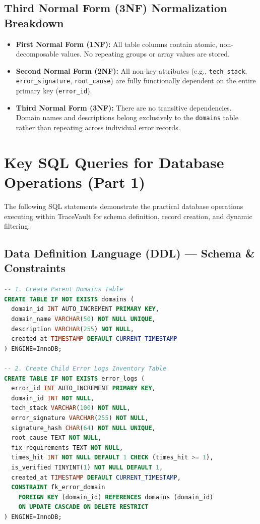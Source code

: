 \documentclass[10pt,a4paper]{article}
\begin{document}
\subsection{Third Normal Form (3NF) Normalization Breakdown}
\begin{itemize}
  \item \textbf{First Normal Form (1NF):} All table columns contain atomic, non-decomposable values. No repeating groups or array values are stored.
  \item \textbf{Second Normal Form (2NF):} All non-key attributes (e.g., \texttt{tech\_stack}, \texttt{error\_signature}, \texttt{root\_cause}) are fully functionally dependent on the entire primary key (\texttt{error\_id}).
  \item \textbf{Third Normal Form (3NF):} There are no transitive dependencies. Domain names and descriptions belong exclusively to the \texttt{domains} table rather than repeating across individual error records.
\end{itemize}

\newpage

\section{Key SQL Queries for Database Operations (Part 1)}
The following SQL statements demonstrate the practical database operations executing within TraceVault for schema definition, record creation, and dynamic filtering:

\subsection{Data Definition Language (DDL) --- Schema \& Constraints}
\begin{lstlisting}[language=SQL, caption={DDL Table Creation with Referential Integrity and Check Constraints}]
-- 1. Create Parent Domains Table
CREATE TABLE IF NOT EXISTS domains (
  domain_id INT AUTO_INCREMENT PRIMARY KEY,
  domain_name VARCHAR(50) NOT NULL UNIQUE,
  description VARCHAR(255) NOT NULL,
  created_at TIMESTAMP DEFAULT CURRENT_TIMESTAMP
) ENGINE=InnoDB;

-- 2. Create Child Error Logs Inventory Table
CREATE TABLE IF NOT EXISTS error_logs (
  error_id INT AUTO_INCREMENT PRIMARY KEY,
  domain_id INT NOT NULL,
  tech_stack VARCHAR(100) NOT NULL,
  error_signature VARCHAR(255) NOT NULL,
  signature_hash CHAR(64) NOT NULL UNIQUE,
  root_cause TEXT NOT NULL,
  fix_requirements TEXT NOT NULL,
  times_hit INT NOT NULL DEFAULT 1 CHECK (times_hit >= 1),
  is_verified TINYINT(1) NOT NULL DEFAULT 1,
  created_at TIMESTAMP DEFAULT CURRENT_TIMESTAMP,
  CONSTRAINT fk_error_domain
    FOREIGN KEY (domain_id) REFERENCES domains (domain_id)
    ON UPDATE CASCADE ON DELETE RESTRICT
) ENGINE=InnoDB;
\end{lstlisting}
\end{document}

